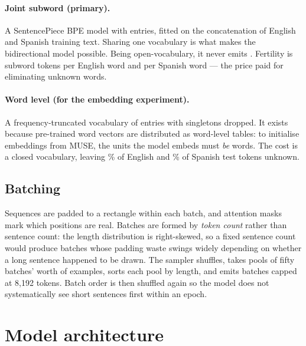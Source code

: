 \documentclass[11pt,a4paper]{article}
\begin{document}
\paragraph{Joint subword (primary).} A SentencePiece BPE model with
\SubwordVocab{} entries, fitted on the concatenation of English and Spanish
training text. Sharing one vocabulary is what makes the bidirectional model
possible. Being open-vocabulary, it never emits . Fertility is
\FertilityEn{} subword tokens per English word and \FertilityEs{} per Spanish
word --- the price paid for eliminating unknown words.

\paragraph{Word level (for the embedding experiment).} A frequency-truncated
vocabulary of \WordVocab{} entries with singletons dropped. It exists because
pre-trained word vectors are distributed as word-level tables: to initialise
embeddings from MUSE, the units the model embeds must \emph{be} words. The cost
is a closed vocabulary, leaving \OovEnPercent\% of English and
\OovEsPercent\% of Spanish test tokens unknown.


\subsection{Batching}

Sequences are padded to a rectangle within each batch, and attention masks mark
which positions are real. Batches are formed by \emph{token count} rather than
sentence count: the length distribution is right-skewed, so a fixed sentence
count would produce batches whose padding waste swings widely depending on
whether a long sentence happened to be drawn. The sampler shuffles, takes pools
of fifty batches' worth of examples, sorts each pool by length, and emits
batches capped at 8{,}192 tokens. Batch order is then shuffled again so the
model does not systematically see short sentences first within an epoch.

\section{Model architecture}
\label{sec:architecture}
\end{document}
